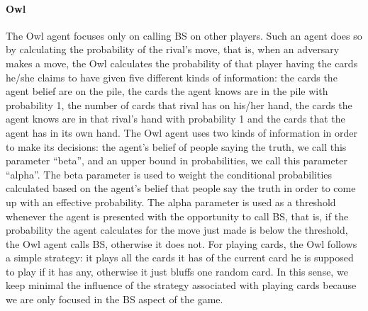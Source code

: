 \documentclass[a4paper,11pt]{article}
\begin{document}
	\paragraph{Owl}
	The Owl agent focuses only on calling BS on other players. Such an agent does so by calculating the probability of the rival’s move, that is, when an adversary makes a move, the Owl calculates the probability of that player having the cards he/she claims to have given five different kinds of information: the cards the agent belief are on the pile, the cards the agent knows are in the pile with probability 1, the number of cards that rival has on his/her hand, the cards the agent knows are in that rival’s hand with probability 1 and the cards that the agent has in its own hand. The Owl agent uses two kinds of information in order to make its decisions: the agent’s belief of people saying the truth, we call this parameter “beta”, and an upper bound in probabilities, we call this parameter “alpha”. The beta parameter is used to weight the conditional probabilities calculated based on the agent’s belief that people say the truth in order to come up with an effective probability. The alpha parameter is used as a threshold whenever the agent is presented with the opportunity to call BS, that is, if the probability the agent calculates for the move just made is below the threshold, the Owl agent calls BS, otherwise it does not. For playing cards, the Owl follows a simple strategy: it plays all the cards it has of the current card he is supposed to play if it has any, otherwise it just bluffs one random card. In this sense, we keep minimal the influence of the strategy associated with playing cards because we are only focused in the BS aspect of the game.
\end{document}
